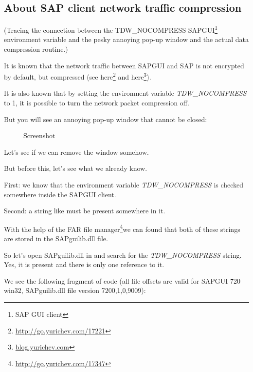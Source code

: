 \subsection{About SAP client network traffic compression}
\label{sec:SAPGUI}

\newcommand{\TDWNC}{TDW\_NOCOMPRESS\xspace}

(Tracing the connection between the \TDWNC{}
SAPGUI\footnote{SAP GUI client} environment variable and 
the pesky annoying pop-up window and the actual data compression routine.)
 
It is known that the network traffic between SAPGUI and SAP is not encrypted by default, but compressed
(see here\footnote{\url{http://go.yurichev.com/17221}} 
and here\footnote{\href{http://go.yurichev.com/17225}{blog.yurichev.com}}). 

It is also known that by setting the environment variable \emph{\TDWNC} to 1, it is possible to turn the network packet compression off.

But you will see an annoying pop-up window that cannot be closed:

\begin{figure}[H]
\centering
{}
\caption{Screenshot}
\end{figure}

Let's see if we can remove the window somehow.

But before this, let's see what we already know.

First: we know that the environment variable \emph{\TDWNC} is checked somewhere inside the SAPGUI client.

Second: a string like  must be present somewhere in it.
\newcommand{\FNURLFAR}{\footnote{\url{http://go.yurichev.com/17347}}}

With the help of the FAR file manager\FNURLFAR we can found that both of these strings are stored in the SAPguilib.dll file.

So let's open SAPguilib.dll in \IDA and search for the \emph{\TDWNC} string. 
Yes, it is present and there is only one reference to it.

We see the following fragment of code 
(all file offsets are valid for SAPGUI 720 win32, SAPguilib.dll file version 7200,1,0,9009):




